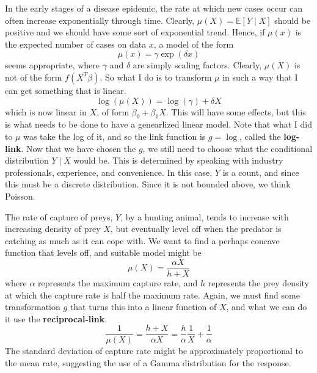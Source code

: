 \documentclass{article}
\begin{document}
  \begin{example}
    In the early stages of a disease epidemic, the rate at which new cases occur can often increase exponentially through time. Clearly, $\mu(X) = \mathbb{E}[Y \mid X]$ should be positive and we should have some sort of exponential trend. Hence, if $\mu(x)$ is the expected number of cases on data $x$, a model of the form 
    \begin{equation}
      \mu(x) = \gamma \exp (\delta x)
    \end{equation}
    seems appropriate, where $\gamma$ and $\delta$ are simply scaling factors. Clearly, $\mu(X)$ is not of the form $f(X^T \beta)$. So what I do is to transform $\mu$ in such a way that I can get something that is linear. 
    \begin{equation}
      \log(\mu(X)) = \log(\gamma) + \delta X
    \end{equation}
    which is now linear in $X$, of form $\beta_0 + \beta_1 X$. This will have some effects, but this is what needs to be done to have a genearlized linear model. Note that what I did to $\mu$ was take the log of it, and so the link function is $g = \log$, called the \textbf{log-link}. Now that we have chosen the $g$, we still need to choose what the conditional distribution $Y \mid X$ would be. This is determined by speaking with industry professionals, experience, and convenience. In this case, $Y$ is a count, and since this must be a discrete distribution. Since it is not bounded above, we think Poisson. 
  \end{example}

  \begin{example}
    The rate of capture of preys, $Y$, by a hunting animal, tends to increase with increasing density of prey $X$, but eventually level off when the predator is catching as much as it can cope with. We want to find a perhaps concave function that levels off, and suitable model might be 
    \begin{equation}
      \mu(X) = \frac{\alpha X}{h + X}
    \end{equation}
    where $\alpha$ represents the maximum capture rate, and $h$ represents the prey density at which the capture rate is half the maximum rate. Again, we must find some transformation $g$ that turns this into a linear function of $X$, and what we can do it use the \textbf{reciprocal-link}. 
    \begin{equation}
      \frac{1}{\mu(X)} = \frac{h + X}{\alpha X} = \frac{h}{\alpha} \frac{1}{X} + \frac{1}{\alpha}
    \end{equation}
    The standard deviation of capture rate might be approximately proportional to the mean rate, suggesting the use of a Gamma distribution for the response. 
  \end{example}
\end{document}
